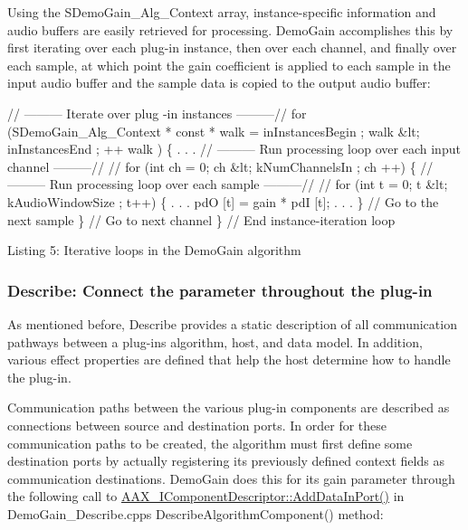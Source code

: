 Using the {\ttfamily S\+Demo\+Gain\+\_\+\+Alg\+\_\+\+Context} array, instance-\/specific information and audio buffers are easily retrieved for processing. Demo\+Gain accomplishes this by first iterating over each plug-\/in instance, then over each channel, and finally over each sample, at which point the gain coefficient is applied to each sample in the input audio buffer and the sample data is copied to the output audio buffer\+:


\begin{DoxyCode}
\textcolor{comment}{// --------- Iterate over plug -in instances ---------//}
\textcolor{keywordflow}{for} (SDemoGain\_Alg\_Context * \textcolor{keyword}{const} * walk = inInstancesBegin ; walk &lt;
    inInstancesEnd ; ++ walk )
\{
        .
        .
        .
    \textcolor{comment}{// --------- Run processing loop over each input channel ---------//}
    \textcolor{comment}{//}
    \textcolor{keywordflow}{for} (\textcolor{keywordtype}{int} ch = 0; ch &lt; kNumChannelsIn ; ch ++)
    \{
        \textcolor{comment}{// --------- Run processing loop over each sample ---------//}
        \textcolor{comment}{//}
        \textcolor{keywordflow}{for} (\textcolor{keywordtype}{int} t = 0; t &lt; kAudioWindowSize ; t++)
        \{
                .
                .
                .
        pdO [t] = gain * pdI [t];
                .
                .
                .
        \} \textcolor{comment}{// Go to the next sample}
    \} \textcolor{comment}{// Go to next channel}
 \} \textcolor{comment}{// End instance-iteration loop }
\end{DoxyCode}
  Listing 5\+: Iterative loops in the Demo\+Gain algorithm

\hypertarget{a00324_subsection__describe_connect_the_parameter_throughout_the_plug-in}{}\subsubsection{Describe\+: Connect the parameter throughout the plug-\/in}\label{a00324_subsection__describe_connect_the_parameter_throughout_the_plug-in}
 As mentioned before, Describe provides a static description of all communication pathways between a plug-\/in\textquotesingle{}s algorithm, host, and data model. In addition, various effect properties are defined that help the host determine how to handle the plug-\/in.

Communication paths between the various plug-\/in components are described as connections between source and destination ports. In order for these communication paths to be created, the algorithm must first define some destination ports by actually registering its previously defined context fields as communication destinations. Demo\+Gain does this for its gain parameter through the following call to \hyperlink{a00088_a230293b9f6bb413626cd487ca501df75}{A\+A\+X\+\_\+\+I\+Component\+Descriptor\+::\+Add\+Data\+In\+Port()} in Demo\+Gain\+\_\+\+Describe.\+cpp\textquotesingle{}s {\ttfamily Describe\+Algorithm\+Component()} method\+:


